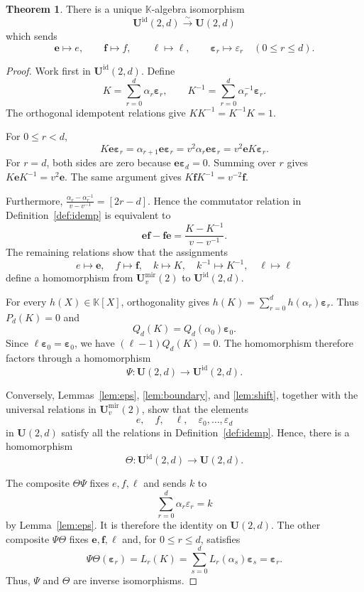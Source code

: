 \documentclass[12pt]{amsart}
\numberwithin{equation}{section}
\theoremstyle{definition}
\newtheorem{theorem}{Theorem}[section]
\theoremstyle{definition}
\newcommand{\kk}{\mathbb K}
\newcommand{\Umir}{\mathbf U^{\mathrm{mir}}_v(2)}
\newcommand{\Ufd}{\mathbf U(2,d)}
\newcommand{\eps}{\varepsilon}
\newcommand{\be}{\boldsymbol e}
\newcommand{\bfm}{\boldsymbol f}
\newcommand{\bell}{\boldsymbol\ell}
\newcommand{\beps}{\boldsymbol\varepsilon}
\begin{document}
\begin{theorem}\label{thm:idemp}
There is a unique $\kk$-algebra isomorphism
$$
\mathbf U^{\mathrm{id}}(2,d)
\xrightarrow{\ \sim\ }
\Ufd
$$
which sends
$$
\be\mapsto e,
\qquad
\bfm\mapsto f,
\qquad
\bell\mapsto\ell,
\qquad
\beps_r\mapsto\eps_r
\quad(0\le r\le d).
$$
\end{theorem}
\begin{proof}
    Work first in $\mathbf U^{\mathrm{id}}(2,d)$. Define
$$
K=\sum_{r=0}^{d}\alpha_r\beps_r,
\qquad
K^{-1}=\sum_{r=0}^{d}\alpha_r^{-1}\beps_r.
$$
The orthogonal idempotent relations give $KK^{-1}=K^{-1}K=1$.


For $0\le r<d$,
$$
K\be\beps_r
=\alpha_{r+1}\be\beps_r
=v^2\alpha_r\be\beps_r
=v^2\be K\beps_r.
$$
For $r=d$, both sides are zero because $\be\beps_d=0$. Summing over $r$ gives $K\be K^{-1}=v^2\be$. The same argument gives $K\bfm K^{-1}=v^{-2}\bfm$.

Furthermore, $\frac{\alpha_r-\alpha_r^{-1}}{v-v^{-1}}=[2r-d]$. 
Hence the commutator relation in Definition~\ref{def:idemp} is equivalent to
$$
\be\bfm-\bfm\be
=\frac{K-K^{-1}}{v-v^{-1}}.
$$
The remaining relations show that the assignments
$$
e\mapsto\be,
\quad
f\mapsto\bfm,
\quad
k\mapsto K,
\quad
k^{-1}\mapsto K^{-1},
\quad
\ell\mapsto\bell
$$
define a homomorphism from $\Umir$ to $\mathbf U^{\mathrm{id}}(2,d)$.

For every $h(X)\in\kk[X]$, orthogonality gives $h(K)=\sum_{r=0}^{d}h(\alpha_r)\beps_r$. 
Thus $P_d(K)=0$ and
$$
Q_d(K)=Q_d(\alpha_0)\beps_0.
$$
Since $\bell\beps_0=\beps_0$, we have $(\bell-1)Q_d(K)=0$. The homomorphism therefore factors through a homomorphism
$$
\Psi:\Ufd\longrightarrow\mathbf U^{\mathrm{id}}(2,d).
$$

Conversely, Lemmas~\ref{lem:eps}, \ref{lem:boundary}, and \ref{lem:shift}, together with the universal relations in $\Umir$, show that the elements
$$
e,\quad f,\quad\ell,\quad\eps_0,\ldots,\eps_d
$$
in $\Ufd$ satisfy all the relations in Definition~\ref{def:idemp}. Hence, there is a homomorphism
$$
\Theta:\mathbf U^{\mathrm{id}}(2,d)\longrightarrow\Ufd.
$$

The composite $\Theta\Psi$ fixes $e,f,\ell$ and sends $k$ to
$$
\sum_{r=0}^{d}\alpha_r\eps_r=k
$$
by Lemma~\ref{lem:eps}. It is therefore the identity on $\Ufd$. The other composite $\Psi\Theta$ fixes $\be,\bfm,\bell$ and, for $0\le r\le d$, satisfies
$$
\Psi\Theta(\beps_r)
=L_r(K)
=\sum_{s=0}^{d}L_r(\alpha_s)\beps_s
=\beps_r.
$$
Thus, $\Psi$ and $\Theta$ are inverse isomorphisms.
\end{proof}
\end{document}
